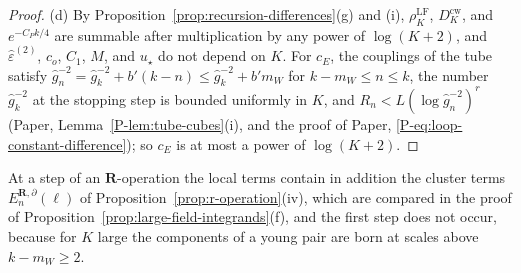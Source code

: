 \documentclass[11pt]{preprint}
\numberwithin{equation}{section}
\theoremstyle{definition}
\theoremstyle{remark}
\theoremstyle{plain}
\begin{document}
\begin{proof}
(d) By Proposition~\ref{prop:recursion-differences}(g) and (i), $\rho^{\mathrm{LF}}_K$, $D^{\mathrm{cw}}_K$, and $e^{-C_Pk/4}$ are summable after multiplication by any power of $\log(K + 2)$, and $\hat\varepsilon^{(2)}$, $c_o$, $C_1$, $M$, and $u_\star$ do not depend on $K$. For $c_E$, the couplings of the tube satisfy $\hat g_n^{-2} = \hat g_k^{-2} + b'(k - n) \leq \hat g_k^{-2} + b'm_W$ for $k - m_W \leq n \leq k$, the number $\hat g_k^{-2}$ at the stopping step is bounded uniformly in $K$, and $R_n < L(\log\hat g_n^{-2})^r$ (Paper, Lemma~\ref{P-lem:tube-cubes}(i), and the proof of Paper, \eqref{P-eq:loop-constant-difference}); so $c_E$ is at most a power of $\log(K + 2)$.
\end{proof}

At a step of an $\mathbf R$-operation the local terms contain in addition the cluster terms $E^{\mathbf R,\partial}_n(\ell)$ of Proposition~\ref{prop:r-operation}(iv), which are compared in the proof of Proposition~\ref{prop:large-field-integrands}(f), and the first step does not occur, because for $K$ large the components of a young pair are born at scales above $k - m_W \geq 2$.



\end{document}
